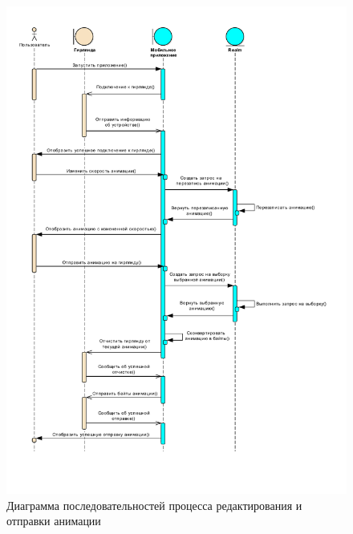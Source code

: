 \newpage
{}
\label{app:sequence}

~
\begin{figure}[H]
\centering
	\includegraphics[scale=0.75]{figures/diagrams/uml_sequence.pdf}
	\caption{Диаграмма последовательностей процесса редактирования и отправки анимации}
	\label{fig:appendices:sequence}
\end{figure}